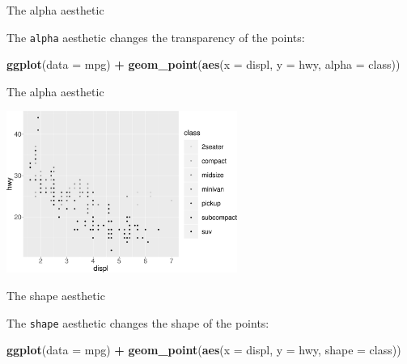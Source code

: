 \documentclass[ignorenonframetext,]{beamer}
\newenvironment{Shaded}{\begin{snugshade}}{\end{snugshade}}
\newcommand{\DataTypeTok}[1]{\textcolor[rgb]{0.13,0.29,0.53}{#1}}
\newcommand{\KeywordTok}[1]{\textcolor[rgb]{0.13,0.29,0.53}{\textbf{#1}}}
\newcommand{\NormalTok}[1]{#1}
\newcommand{\OperatorTok}[1]{\textcolor[rgb]{0.81,0.36,0.00}{\textbf{#1}}}
\newcommand{\StringTok}[1]{\textcolor[rgb]{0.31,0.60,0.02}{#1}}
\begin{document}
\begin{frame}[fragile]{The alpha aesthetic}
\protect\hypertarget{the-alpha-aesthetic}{}

The \texttt{alpha} aesthetic changes the transparency of the points:

\begin{Shaded}
\begin{Highlighting}[]
\KeywordTok{ggplot}\NormalTok{(}\DataTypeTok{data =}\NormalTok{ mpg) }\OperatorTok{+}
\StringTok{  }\KeywordTok{geom_point}\NormalTok{(}\KeywordTok{aes}\NormalTok{(}\DataTypeTok{x =}\NormalTok{ displ, }\DataTypeTok{y =}\NormalTok{ hwy, }\DataTypeTok{alpha =}\NormalTok{ class))}
\end{Highlighting}
\end{Shaded}

\end{frame}

\begin{frame}{The alpha aesthetic}
\protect\hypertarget{the-alpha-aesthetic-1}{}

\begin{center}\includegraphics[height=200px]{data-visualization_files/figure-beamer/unnamed-chunk-14-1} \end{center}

\end{frame}

\begin{frame}[fragile]{The shape aesthetic}
\protect\hypertarget{the-shape-aesthetic}{}

The \texttt{shape} aesthetic changes the shape of the points:

\begin{Shaded}
\begin{Highlighting}[]
\KeywordTok{ggplot}\NormalTok{(}\DataTypeTok{data =}\NormalTok{ mpg) }\OperatorTok{+}
\StringTok{  }\KeywordTok{geom_point}\NormalTok{(}\KeywordTok{aes}\NormalTok{(}\DataTypeTok{x =}\NormalTok{ displ, }\DataTypeTok{y =}\NormalTok{ hwy, }\DataTypeTok{shape =}\NormalTok{ class))}
\end{Highlighting}
\end{Shaded}

\end{frame}
\end{document}
